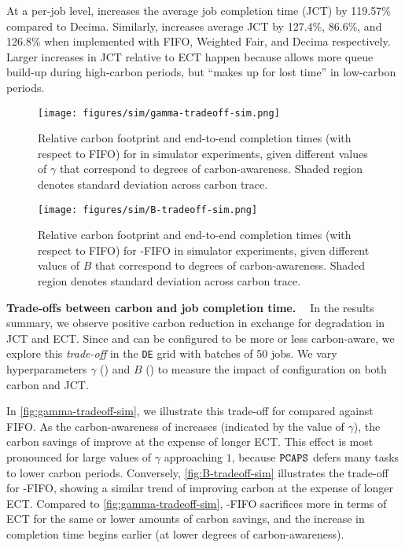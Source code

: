 At a per-job level, \DANISH increases the average job completion time (JCT) by 119.57\% compared to Decima.  Similarly, \CAP increases average JCT by 127.4\%, 86.6\%, and 126.8\% when implemented with FIFO, Weighted Fair, and Decima respectively.  Larger increases in JCT relative to ECT 
happen because \DANISH allows more queue build-up during high-carbon periods, but ``makes up for lost time'' in low-carbon periods.  

\begin{figure}[t]
    \centering 
    \texttt{[image: figures/sim/gamma-tradeoff-sim.png]} \vspace{-1em}
    \caption{ Relative carbon footprint and end-to-end completion times (with respect to FIFO) for \DANISH in simulator experiments, given different values of $\gamma$ that correspond to degrees of carbon-awareness. Shaded region denotes standard deviation across carbon trace. }
    \vspace{-0.5cm}
    \label{fig:gamma-tradeoff-sim}
\end{figure}
\begin{figure}[h]
    \centering 
    \texttt{[image: figures/sim/B-tradeoff-sim.png]} \vspace{-1em}
    \caption{ Relative carbon footprint and end-to-end completion times (with respect to FIFO) for \CAP-FIFO in simulator experiments, given different values of $B$ that correspond to degrees of carbon-awareness.  Shaded region denotes standard deviation across carbon trace. }
    \label{fig:B-tradeoff-sim} \vspace{-0.5cm}
\end{figure}




\noindent \textbf{Trade-offs between carbon and job completion time. \ }
In the results summary, we observe positive carbon reduction in exchange for degradation in JCT and ECT.  Since \DANISH and \CAP can be configured to be more or less carbon-aware, we explore this \textit{trade-off} in the \verb|DE| grid with batches of 50 jobs.  We vary hyperparameters $\gamma$ (\DANISH) and $B$ (\CAP) to measure the impact of configuration on both carbon and JCT.



In \autoref{fig:gamma-tradeoff-sim}, we illustrate this trade-off for \DANISH compared against FIFO.  As the carbon-awareness of \DANISH increases (indicated by the value of $\gamma$), the carbon savings of \DANISH improve at the expense of longer ECT.  This effect is most pronounced for large values of $\gamma$ approaching $1$, because $\texttt{PCAPS}$ defers many tasks to lower carbon periods.
Conversely, \autoref{fig:B-tradeoff-sim} illustrates the trade-off for \CAP-FIFO, showing a similar trend of improving carbon at the expense of longer ECT.  Compared to \autoref{fig:gamma-tradeoff-sim}, \CAP-FIFO sacrifices more in terms of ECT for the same or lower amounts of carbon savings, and the increase in completion time begins earlier (at lower degrees of carbon-awareness).


